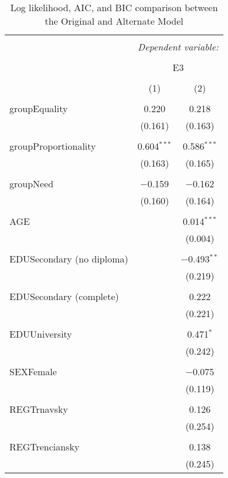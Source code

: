 \documentclass[titlepage]{article}
\begin{document}
\begin{table}[!htbp] \centering 
  \caption{Log likelihood, AIC, and BIC comparison between the Original and Alternate Model} 
  \label{table:aicbictable}
  \resizebox{10cm}{!} {
\begin{tabular}{@{\extracolsep{5pt}}lcc} 
\\[-1.8ex]\hline 
\hline \\[-1.8ex] 
 & \multicolumn{2}{c}{\textit{Dependent variable:}} \\ 
\cline{2-3} 
\\[-1.8ex] & \multicolumn{2}{c}{E3} \\ 
\\[-1.8ex] & (1) & (2)\\ 
\hline \\[-1.8ex] 
 groupEquality & 0.220 & 0.218 \\ 
  & (0.161) & (0.163) \\ 
  & & \\ 
 groupProportionality & 0.604$^{***}$ & 0.586$^{***}$ \\ 
  & (0.163) & (0.165) \\ 
  & & \\ 
 groupNeed & $-$0.159 & $-$0.162 \\ 
  & (0.160) & (0.164) \\ 
  & & \\ 
 AGE &  & 0.014$^{***}$ \\ 
  &  & (0.004) \\ 
  & & \\ 
 EDUSecondary (no diploma) &  & $-$0.493$^{**}$ \\ 
  &  & (0.219) \\ 
  & & \\ 
 EDUSecondary (complete) &  & 0.222 \\ 
  &  & (0.221) \\ 
  & & \\ 
 EDUUniversity &  & 0.471$^{*}$ \\ 
  &  & (0.242) \\ 
  & & \\ 
 SEXFemale &  & $-$0.075 \\ 
  &  & (0.119) \\ 
  & & \\ 
 REGTrnavsky &  & 0.126 \\ 
  &  & (0.254) \\ 
  & & \\ 
 REGTrenciansky &  & 0.138 \\ 
  &  & (0.245) \\ 

\end{tabular}}
\end{table}
\end{document}
